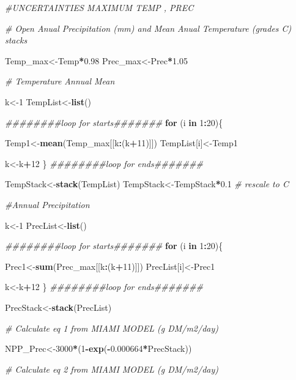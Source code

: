 \documentclass[
  10pt,
  b5paper,
]{book}
\newenvironment{Shaded}{\begin{snugshade}}{\end{snugshade}}
\newcommand{\CommentTok}[1]{\textcolor[rgb]{0.56,0.35,0.01}{\textit{#1}}}
\newcommand{\ControlFlowTok}[1]{\textcolor[rgb]{0.13,0.29,0.53}{\textbf{#1}}}
\newcommand{\DecValTok}[1]{\textcolor[rgb]{0.00,0.00,0.81}{#1}}
\newcommand{\FloatTok}[1]{\textcolor[rgb]{0.00,0.00,0.81}{#1}}
\newcommand{\KeywordTok}[1]{\textcolor[rgb]{0.13,0.29,0.53}{\textbf{#1}}}
\newcommand{\NormalTok}[1]{#1}
\newcommand{\OperatorTok}[1]{\textcolor[rgb]{0.81,0.36,0.00}{\textbf{#1}}}
\begin{document}
\begin{Shaded}
\begin{Highlighting}[]
\CommentTok{#UNCERTAINTIES MAXIMUM TEMP , PREC}

\CommentTok{# Open Anual Precipitation (mm) and Mean Anual Temperature (grades C) stacks}

\NormalTok{Temp_max<-Temp}\OperatorTok{*}\FloatTok{0.98}
\NormalTok{Prec_max<-Prec}\OperatorTok{*}\FloatTok{1.05}

\CommentTok{# Temperature Annual Mean }

\NormalTok{k<-}\DecValTok{1}
\NormalTok{TempList<-}\KeywordTok{list}\NormalTok{()}

\CommentTok{########loop for starts#######}
\ControlFlowTok{for}\NormalTok{ (i }\ControlFlowTok{in} \DecValTok{1}\OperatorTok{:}\DecValTok{20}\NormalTok{)\{}

\NormalTok{Temp1<-}\KeywordTok{mean}\NormalTok{(Temp_max[[k}\OperatorTok{:}\NormalTok{(k}\OperatorTok{+}\DecValTok{11}\NormalTok{)]])}
\NormalTok{TempList[i]<-Temp1}

\NormalTok{k<-k}\OperatorTok{+}\DecValTok{12}
\NormalTok{\}}
\CommentTok{########loop for ends#######}

\NormalTok{TempStack<-}\KeywordTok{stack}\NormalTok{(TempList)}
\NormalTok{TempStack<-TempStack}\OperatorTok{*}\FloatTok{0.1} \CommentTok{# rescale to C}

\CommentTok{#Annual Precipitation}

\NormalTok{k<-}\DecValTok{1}
\NormalTok{PrecList<-}\KeywordTok{list}\NormalTok{()}

\CommentTok{########loop for starts#######}
\ControlFlowTok{for}\NormalTok{ (i }\ControlFlowTok{in} \DecValTok{1}\OperatorTok{:}\DecValTok{20}\NormalTok{)\{}

\NormalTok{Prec1<-}\KeywordTok{sum}\NormalTok{(Prec_max[[k}\OperatorTok{:}\NormalTok{(k}\OperatorTok{+}\DecValTok{11}\NormalTok{)]])}
\NormalTok{PrecList[i]<-Prec1}

\NormalTok{k<-k}\OperatorTok{+}\DecValTok{12}
\NormalTok{\}}
\CommentTok{########loop for ends#######}

\NormalTok{PrecStack<-}\KeywordTok{stack}\NormalTok{(PrecList)}

\CommentTok{# Calculate eq 1 from MIAMI MODEL (g DM/m2/day)}

\NormalTok{NPP_Prec<-}\DecValTok{3000}\OperatorTok{*}\NormalTok{(}\DecValTok{1}\OperatorTok{-}\KeywordTok{exp}\NormalTok{(}\OperatorTok{-}\FloatTok{0.000664}\OperatorTok{*}\NormalTok{PrecStack))}

\CommentTok{# Calculate eq 2 from MIAMI MODEL (g DM/m2/day)}


\end{Highlighting}
\end{Shaded}
\end{document}

